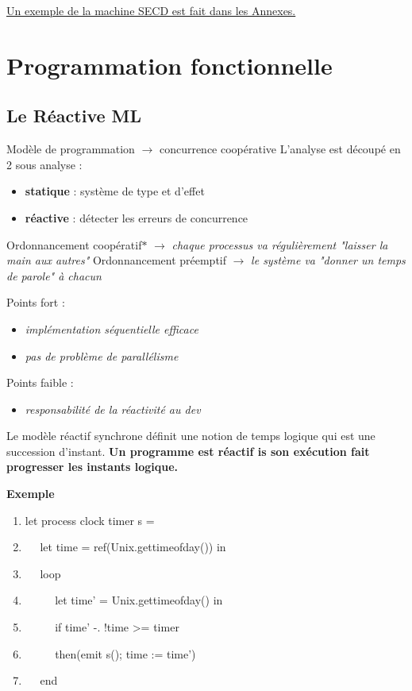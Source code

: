 \documentclass[10pt,a4paper]{article}
\begin{document}
			
			\hyperref[SECD]{Un exemple de la machine SECD est fait dans les Annexes.}
			
		\newpage
	\section{Programmation fonctionnelle}\label{Recherche}
		\subsection{Le Réactive ML}
				Modèle de programmation $\longrightarrow$ concurrence coopérative 
				\smallbreak
				L'analyse est découpé en 2 sous analyse :
				\begin{itemize}
					\item \textbf{statique} : système de type et d'effet
					\item \textbf{réactive} : détecter les erreurs de concurrence
				\end{itemize}
				\bigbreak
			
			
				Ordonnancement coopératif$\ast$ $\longrightarrow$ \textit{\small{chaque processus va r\'{e}guli\`{e}rement "laisser la main aux autres"}}
				\smallbreak
				Ordonnancement pr\'{e}emptif $\longrightarrow$ \textit{\small{le syst\`{e}me va "donner un temps de parole" \`{a} chacun}}
				\medbreak
				
				Points fort :
				\begin{itemize}
					\item \textit{\small{impl\'{e}mentation s\'{e}quentielle efficace}}
					\item \textit{\small{pas de probl\`{e}me de parall\'{e}lisme}}
				\end{itemize}
				\medbreak
				
				Points faible : 
				\begin{itemize}
					\item \textit{\small{responsabilit\'{e} de la r\'{e}activit\'{e} au dev}}
				\end{itemize}
				\medbreak
				
				Le mod\`{e}le r\'{e}actif synchrone d\'{e}finit une notion de temps logique qui est une succession d'instant.
				\smallbreak
				\textbf{
					Un programme est r\'{e}actif is son ex\'{e}cution fait progresser les instants logique.
				}
				\medbreak
				
				\textbf{Exemple}
				\medbreak
				
				\begin{enumerate}
				 	\item let process clock timer s =
				 	\item $\quad$ let time = ref(Unix.gettimeofday()) in
				 	\item $\quad$ loop
				 	\item $\quad$ $\quad$ let time' = Unix.gettimeofday() in
				 	\item $\quad$ $\quad$ if time' -. !time >= timer
				 	\item $\quad$ $\quad$ then(emit s(); time := time')
				 	\item $\quad$ end 
				\end{enumerate}
				\medbreak
				
\end{document}
